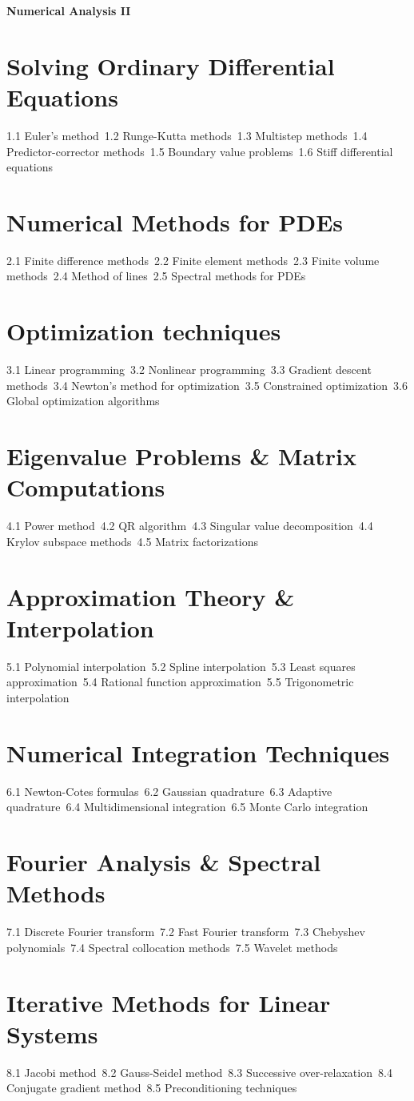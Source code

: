 {\LARGE \bf{Numerical Analysis II}}
\section{Solving Ordinary Differential Equations}
1.1 Euler's method\
1.2 Runge-Kutta methods\
1.3 Multistep methods\
1.4 Predictor-corrector methods\
1.5 Boundary value problems\
1.6 Stiff differential equations\
\section{Numerical Methods for PDEs}
2.1 Finite difference methods\
2.2 Finite element methods\
2.3 Finite volume methods\
2.4 Method of lines\
2.5 Spectral methods for PDEs\
\section{Optimization techniques}
3.1 Linear programming\
3.2 Nonlinear programming\
3.3 Gradient descent methods\
3.4 Newton's method for optimization\
3.5 Constrained optimization\
3.6 Global optimization algorithms\
\section{Eigenvalue Problems \& Matrix Computations}
4.1 Power method\
4.2 QR algorithm\
4.3 Singular value decomposition\
4.4 Krylov subspace methods\
4.5 Matrix factorizations\
\section{Approximation Theory \& Interpolation}
5.1 Polynomial interpolation\
5.2 Spline interpolation\
5.3 Least squares approximation\
5.4 Rational function approximation\
5.5 Trigonometric interpolation\
\section{Numerical Integration Techniques}
6.1 Newton-Cotes formulas\
6.2 Gaussian quadrature\
6.3 Adaptive quadrature\
6.4 Multidimensional integration\
6.5 Monte Carlo integration\
\section{Fourier Analysis \& Spectral Methods}
7.1 Discrete Fourier transform\
7.2 Fast Fourier transform\
7.3 Chebyshev polynomials\
7.4 Spectral collocation methods\
7.5 Wavelet methods\
\section{Iterative Methods for Linear Systems}
8.1 Jacobi method\
8.2 Gauss-Seidel method\
8.3 Successive over-relaxation\
8.4 Conjugate gradient method\
8.5 Preconditioning techniques\
